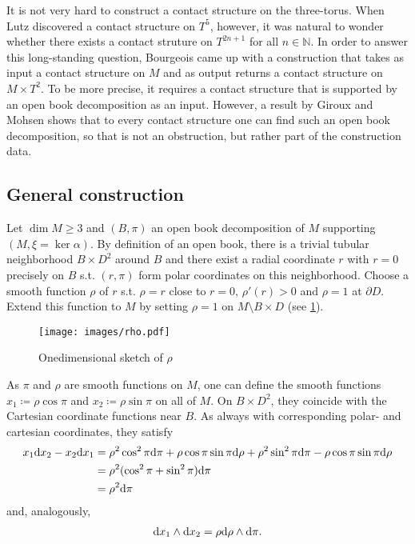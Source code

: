 It is not very hard to construct a contact structure on the three-torus. 
When Lutz \cite{Lutz79} discovered a contact structure on $T^5$, however,
it was natural to wonder whether there exists a contact struture on $T^{2n+1}$ for all $n \in \mathbb N$.
In order to answer this long-standing question, Bourgeois \cite{Bourgeois02} came up with a construction that takes as input a contact structure on $M$ 
and as output returns a contact structure on $M\times T^2$.
To be more precise, it requires a contact structure that is supported by an open book decomposition as an input.
However, a result by Giroux and Mohsen \cite[Theorem 7.3.5]{Geiges08} shows that to every contact structure one can find such an open book decomposition,
so that is not an obstruction, but rather part of the construction data.

\subsection{General construction}
Let $\operatorname{dim} M \geq 3$ and $(B, \pi)$ an open book decomposition of $M$ supporting $(M, \xi = \ker \alpha)$.
By definition of an open book, there is a trivial tubular neighborhood $B \times D^2$ around $B$ and there exist a radial coordinate $r$ with $r = 0$ precisely on $B$
s.t. $(r, \pi)$ form polar coordinates on this neighborhood.
Choose a smooth function $\rho$ of $r$ s.t. $\rho = r$ close to $r = 0$, $\rho'(r) > 0$ and $\rho = 1$ at $\partial D$.
Extend this function to $M$ by setting $\rho = 1$ on $M \setminus B \times D$ (see \cref{fig:rho}).
\begin{figure}
    \texttt{[image: images/rho.pdf]}
    \caption{Onedimensional sketch of $\rho$}
    \label{fig:rho}
\end{figure}
As $\pi$ and $\rho$ are smooth functions on $M$, one can define the smooth functions $x_1 \coloneqq \rho \cos \pi$ and $x_2 \coloneqq \rho \sin \pi$ on all of $M$. 
On $B \times D^2$, they coincide with the Cartesian coordinate functions near $B$.
As always with corresponding polar- and cartesian coordinates, they satisfy
\begin{align*}
    x_1 \mathrm{d} x_2 - x_2 \mathrm{d} x_1 &= \rho^2 \cos^2 \pi \mathrm{d} \pi + \rho \cos \pi \sin \pi \mathrm{d} \rho + \rho^2 \sin^2 \pi \mathrm{d} \pi - \rho \cos \pi \sin \pi \mathrm{d} \rho\\
    &= \rho^2 (\cos^2 \pi + \sin^2 \pi) \mathrm{d} \pi\\
    &= \rho^2 \mathrm{d} \pi
\end{align*}
and, analogously,
\begin{align*}
    \mathrm{d} x_1 \wedge \mathrm{d} x_2 = \rho \mathrm{d} \rho \wedge \mathrm{d} \pi.
\end{align*}

